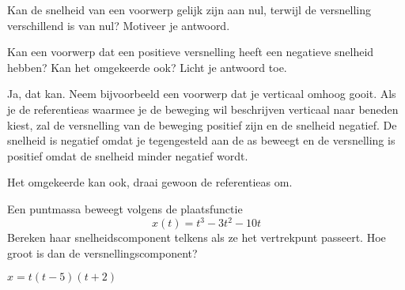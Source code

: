 \documentclass{ximera}
\begin{document}
	\author{Bart Lambregs}
    \xmsource\xmuitleg




\begin{exercise}
	Kan de snelheid van een voorwerp gelijk zijn aan nul, terwijl de versnelling verschillend is van nul? Motiveer je antwoord.
\end{exercise}


\begin{exercise}
	Kan een voorwerp dat een positieve versnelling heeft een negatieve snelheid hebben? Kan het omgekeerde ook? Licht je antwoord toe.

	\begin{oplossing}
		Ja, dat kan. Neem bijvoorbeeld een voorwerp dat je verticaal omhoog gooit. Als je de referentieas waarmee je de beweging wil beschrijven verticaal naar beneden kiest, zal de versnelling van de beweging positief zijn en de snelheid negatief. De snelheid is negatief omdat je tegengesteld aan de as beweegt en de versnelling is positief omdat de snelheid minder negatief wordt.

		Het omgekeerde kan ook, draai gewoon de referentieas om.
	\end{oplossing}
\end{exercise}

\begin{exercise}
	Een puntmassa beweegt volgens de plaatsfunctie
	\[
	x(t)=t^3-3t^2-10t
	\]
	Bereken haar snelheidscomponent telkens als ze het vertrekpunt passeert. Hoe groot is dan de versnellingscomponent?
	\begin{oplossing}
		$x=t(t-5)(t+2)$
	\end{oplossing}
\end{exercise}
\end{document}
